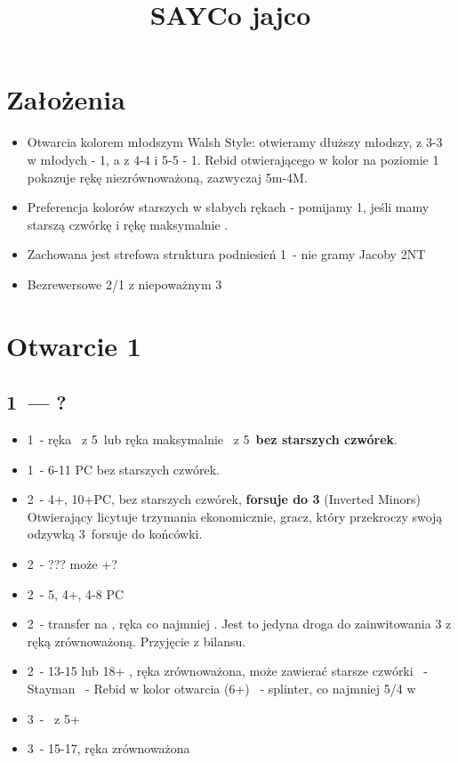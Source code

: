 \documentclass[12pt, a4paper]{article}
\title{\vspace{-2cm}SAYCo jajco}
\author{}
\date{}
\begin{document}
\maketitle
\section{Założenia}
\begin{itemize}
    \item Otwarcia kolorem młodszym Walsh Style: otwieramy dłuższy młodszy, z 3-3 w młodych - 1\clubs, a z 4-4 i
    5-5 - 1\diams. Rebid otwierającego w kolor na poziomie 1 pokazuje rękę niezrównoważoną, zazwyczaj 5m-4M.
    \item Preferencja kolorów starszych w słabych rękach - pomijamy 1\diams, jeśli mamy starszą czwórkę i rękę maksymalnie \inv.
    \item Zachowana jest strefowa struktura podniesień 1\major\ - nie gramy Jacoby 2NT
    \item Bezrewersowe 2/1 z niepoważnym 3\nt
\end{itemize}

\pagebreak

\section{Otwarcie 1\minor}
\subsection{1\clubs\ --- ?}
\begin{itemize}
    \item 1\diams\ - ręka \gf\ z 5\diams\ lub ręka maksymalnie \inv\ z 5\diams\ \textbf{bez starszych czwórek}.
    \item 1\nt\ - 6-11 PC bez starszych czwórek.
    \item 2\clubs\ - 4+\clubs, 10+PC, bez starszych czwórek, \textbf{forsuje do 3\clubs} (Inverted Minors)
        Otwierający licytuje trzymania ekonomicznie,
        gracz, który przekroczy swoją odzywką 3\clubs\ forsuje do końcówki.
    \item 2\diams\ - ??? może \diams+\major?
    \item 2\hearts\ - 5\spades, 4+\hearts, 4-8 PC
    \item 2\spades\ - transfer na \nt, ręka co najmniej \inv. Jest to jedyna droga do zainwitowania 3\nt
        z ręką zrównoważoną. Przyjęcie z bilansu.
    \item 2\nt\ - 13-15 lub 18+ \gf, ręka zrównoważona, może zawierać starsze czwórki
    \clubs\ - Stayman
    \diams\ - Rebid w kolor otwarcia (6+\minor)
    \major\ - splinter, co najmniej 5/4 w \minor
    \item 3\clubs\ - \mixed\ z 5+\clubs\
    \item 3\nt\ - 15-17, ręka zrównoważona
\end{itemize}
\end{document}
